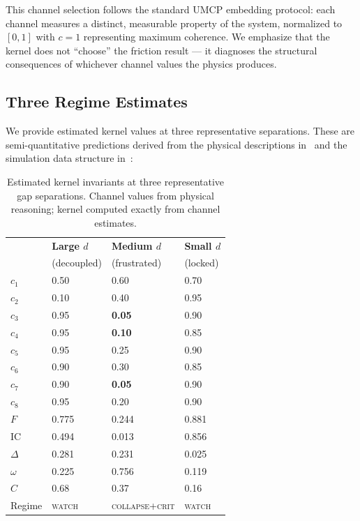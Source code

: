 \documentclass[
  aps,
  prd,
  twocolumn,
  superscriptaddress,
  nofootinbib,
  floatfix
]{revtex4-2}
\newcommand{\regime}[1]{\textrm{\upshape\scshape#1}}
\newcommand{\IC}{\mathrm{IC}}
\begin{document}
This channel selection follows the standard UMCP embedding
protocol: each channel measures a distinct, measurable
property of the system, normalized to $[0,1]$ with $c{=}1$
representing maximum coherence.  We emphasize that the
kernel does not ``choose'' the friction result --- it
diagnoses the structural consequences of whichever
channel values the physics produces.

\subsection{Three Regime Estimates}\label{sec:regimes}

We provide estimated kernel values at three representative
separations.  These are semi-quantitative predictions
derived from the physical descriptions in~\cite{gu2026magnetic}
and the simulation data structure in~\cite{gu2026data}:

\begin{table}[tb]
\caption{\label{tab:regimes}
  Estimated kernel invariants at three representative
  gap separations.  Channel values from physical
  reasoning; kernel computed exactly from channel estimates.}
\begin{ruledtabular}
\begin{tabular}{llll}
  & \textbf{Large $d$} & \textbf{Medium $d$}
  & \textbf{Small $d$} \\
  & \textrm{(decoupled)} & \textrm{(frustrated)}
  & \textrm{(locked)} \\
  \colrule
  $c_1$ & 0.50 & 0.60 & 0.70 \\
  $c_2$ & 0.10 & 0.40 & 0.95 \\
  $c_3$ & 0.95 & \textcolor{CliffRed}{\textbf{0.05}} & 0.90 \\
  $c_4$ & 0.95 & \textcolor{CliffRed}{\textbf{0.10}} & 0.85 \\
  $c_5$ & 0.95 & 0.25 & 0.90 \\
  $c_6$ & 0.90 & 0.30 & 0.85 \\
  $c_7$ & 0.90 & \textcolor{CliffRed}{\textbf{0.05}} & 0.90 \\
  $c_8$ & 0.95 & 0.20 & 0.90 \\
  \colrule
  $F$   & 0.775 & \textcolor{FrustGold}{0.244} & \textcolor{HealGreen}{0.881} \\
  $\IC$ & 0.494 & \textcolor{CliffRed}{0.013} & \textcolor{HealGreen}{0.856} \\
  $\Delta$ & 0.281 & \textcolor{FrustGold}{0.231} & \textcolor{HealGreen}{0.025} \\
  $\omega$ & 0.225 & 0.756 & 0.119 \\
  $C$   & 0.68 & 0.37 & 0.16 \\
  Regime & \regime{watch} &
    \regime{collapse}+\textsc{crit} & \regime{watch} \\
\end{tabular}
\end{ruledtabular}
\end{table}
\end{document}
